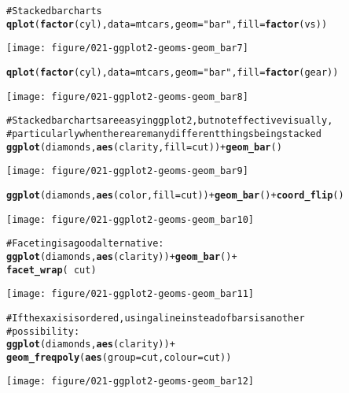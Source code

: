 \documentclass[a4paper,titlepage]{tufte-handout}\usepackage{graphicx, color}
\makeatletter
\def\maxwidth{ %
  \ifdim\Gin@nat@width>\linewidth
    \linewidth
  \else
    \Gin@nat@width
  \fi
}
\newcommand{\hlfunctioncall}[1]{\textcolor[rgb]{0.501960784313725,0,0.329411764705882}{\textbf{#1}}}%
\newcommand{\hlstring}[1]{\textcolor[rgb]{0.6,0.6,1}{#1}}%
\newcommand{\hlcomment}[1]{\textcolor[rgb]{0.180392156862745,0.6,0.341176470588235}{#1}}%
\newenvironment{kframe}{%
 \def\at@end@of@kframe{}%
 \ifinner\ifhmode%
  \def\at@end@of@kframe{\end{minipage}}%
  \begin{minipage}{\columnwidth}%
 \fi\fi%
 \def\FrameCommand##1{\hskip\@totalleftmargin \hskip-\fboxsep
 \colorbox{shadecolor}{##1}\hskip-\fboxsep
     \hskip-\linewidth \hskip-\@totalleftmargin \hskip\columnwidth}%
 \MakeFramed {\advance\hsize-\width
   \@totalleftmargin\z@ \linewidth\hsize
   \@setminipage}}%
 {\par\unskip\endMakeFramed%
 \at@end@of@kframe}
\newenvironment{knitrout}{}{} %
\makeatother
\begin{document}
\begin{knitrout}
\begin{kframe}
\begin{alltt}
\hlcomment{# Stacked bar charts}
\hlfunctioncall{qplot}(\hlfunctioncall{factor}(cyl), data=mtcars, geom=\hlstring{"bar"}, fill=\hlfunctioncall{factor}(vs))
\end{alltt}
\end{kframe}
\texttt{[image: figure/021-ggplot2-geoms-geom\_bar7]} 
\begin{kframe}\begin{alltt}
\hlfunctioncall{qplot}(\hlfunctioncall{factor}(cyl), data=mtcars, geom=\hlstring{"bar"}, fill=\hlfunctioncall{factor}(gear))
\end{alltt}
\end{kframe}
\texttt{[image: figure/021-ggplot2-geoms-geom\_bar8]} 
\begin{kframe}\begin{alltt}

\hlcomment{# Stacked bar charts are easy in ggplot2, but not effective visually,}
\hlcomment{# particularly when there are many different things being stacked}
\hlfunctioncall{ggplot}(diamonds, \hlfunctioncall{aes}(clarity, fill=cut)) + \hlfunctioncall{geom_bar}()
\end{alltt}
\end{kframe}
\texttt{[image: figure/021-ggplot2-geoms-geom\_bar9]} 
\begin{kframe}\begin{alltt}
\hlfunctioncall{ggplot}(diamonds, \hlfunctioncall{aes}(color, fill=cut)) + \hlfunctioncall{geom_bar}() + \hlfunctioncall{coord_flip}()
\end{alltt}
\end{kframe}
\texttt{[image: figure/021-ggplot2-geoms-geom\_bar10]} 
\begin{kframe}\begin{alltt}

\hlcomment{# Faceting is a good alternative:}
\hlfunctioncall{ggplot}(diamonds, \hlfunctioncall{aes}(clarity)) + \hlfunctioncall{geom_bar}() +
  \hlfunctioncall{facet_wrap}(~ cut)
\end{alltt}
\end{kframe}
\texttt{[image: figure/021-ggplot2-geoms-geom\_bar11]} 
\begin{kframe}\begin{alltt}
\hlcomment{# If the x axis is ordered, using a line instead of bars is another}
\hlcomment{# possibility:}
\hlfunctioncall{ggplot}(diamonds, \hlfunctioncall{aes}(clarity)) +
  \hlfunctioncall{geom_freqpoly}(\hlfunctioncall{aes}(group = cut, colour = cut))
\end{alltt}
\end{kframe}
\texttt{[image: figure/021-ggplot2-geoms-geom\_bar12]} 
\begin{kframe}\begin{alltt}


\end{alltt}
\end{kframe}
\end{knitrout}
\end{document}
